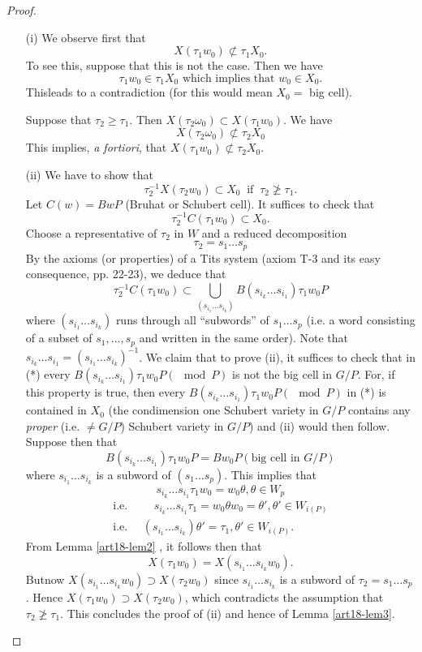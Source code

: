 \begin{proof}
\begin{itemize}
\item[(i)] We observe first that
$$
X (\tau_1 w_0) \not\subset \tau_1 X_0.
$$
To see this, suppose that this is not the case. Then we have
$$
\tau_1 w_0 \in \tau_1 X_0 \text{ which implies that } w_0 \in X_0.
$$
This\pageoriginale leads to a contradiction (for this would mean $X_0 =$ big cell).

Suppose that $\tau_2 \geqslant \tau_1$. Then $X (\tau_2 \omega_0) \subset X (\tau_1 w_0)$. We have 
$$
X (\tau_2 \omega_0) \not\subset \tau_2 X_0
$$
This implies, {\em a fortiori}, that $X(\tau_1 w_0) \not\subset \tau_2 X_0$.

\item[(ii)] We have to show that
$$
\tau^{-1}_2 X(\tau_2 w_0) \subset X_0 ~ \text{ if } ~ \tau_2 \not\geqslant \tau_1 .
$$
Let $C(w) = B w P$ (Bruhat or Schubert cell). It suffices to check that 
$$
\tau^{-1}_2 C(\tau_1 w_0) \subset X_0.
$$
Choose a representative of $\tau_2$ in $W$ and a reduced decomposition
$$
\tau_2 = s_1 \ldots s_p
$$
By the axioms (or properties) of a Tits system (axiom T-3 and its easy consequence, \cf \cite{art18-key4} pp. 22-23), we deduce that
\begin{equation*}
\tau^{-1}_2 C (\tau_1 w_0) \subset \bigcup\limits_{(s_{i_1} \ldots s_{i_k})} B (s_{i_k} \ldots s_{i_1}) \tau_1 w_0 P \tag{*}
\end{equation*}
where $(s_{i_1} \ldots s_{i_k})$ runs through all ``subwords'' of $s_1 \ldots s_p$ (i.e. a word consisting of a subset of $s_1, \ldots, s_p$ and written in the same order). Note that $s_{i_k}\ldots s_{i_1} = (s_{i_1} \ldots s_{i_k})^{-1}$. We claim that to prove (ii), it suffices to check that in (*) every $B(s_{i_k} \ldots s_{i_1}) \tau_1 w_0 P (\mod P)$
is not the big cell in $G/P$. For, if this property is true, then every $B(s_{i_k} \ldots s_{i_1}) \tau_1 w_0 P (\mod P) $ in (*) is contained in $X_0$ (the condimension one Schubert variety in $G/P$ contains any {\em proper} (i.e. $\neq G/P$) Schubert variety in $G/P$) and (ii) would then follow. Suppose then that 
$$
B(s_{i_k} \ldots s_{i_1}) \tau_1 w_0 P = B w_0 P (\text{big cell in }    G/P)
$$
where $s_{i_1} \ldots s_{i_k}$ is a subword of $(s_1 \ldots s_p)$. This implies that
$$
s_{i_k} \ldots s_{i_1} \tau_1 w_0 = w_0 \theta, \theta \in W_p
$$
\begin{align*}
\text{i.e. } \qquad s_{i_k} \ldots s_{i_1} \tau_1 = w_0 \theta w_0 = \theta', \theta' \in W_{i(P)}\\
\text{i.e. } \quad (s_{i_1} \ldots s_{i_k}) \theta' = \tau_1, \theta' \in W_{i(P)}.
\end{align*}
From Lemma \ref{art18-lem2} , it follows then that 
$$
X(\tau_1 w_0) = X(s_{i_1} \ldots s_{i_k} w_0).
$$
But\pageoriginale now $X(s_{i_1} \ldots s_{i_k} w_0) \supset X (\tau_2 w_0)$ since $s_{i_1} \ldots s_{i_k}$ is a subword of $\tau_2 = s_1\ldots s_p$. Hence $X(\tau_1 w_0) \supset X (\tau_2 w_0)$, which contradicts the assumption that $\tau_2 \not\geqslant \tau_1$. This concludes the proof of (ii) and hence of Lemma \ref{art18-lem3}.
\end{itemize}
\end{proof}

